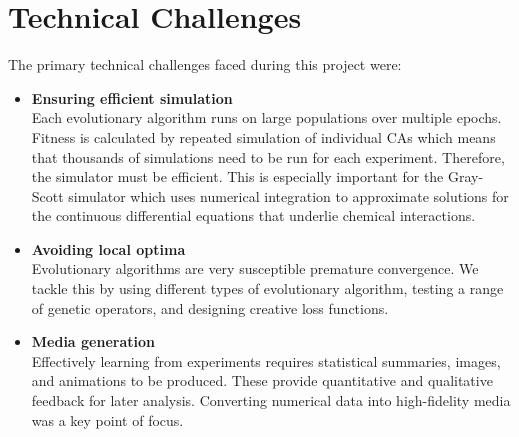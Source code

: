 \section{Technical Challenges}
The primary technical challenges faced during this project were:
\begin{itemize}
    \item \textbf{Ensuring efficient simulation}\\ Each evolutionary algorithm runs on large populations over multiple epochs. Fitness is calculated by repeated simulation of individual CAs which means that thousands of simulations need to be run for each experiment. Therefore, the simulator must be efficient. This is especially important for the Gray-Scott simulator which uses numerical integration to approximate solutions for the continuous differential equations that underlie chemical interactions.
    \item \textbf{Avoiding local optima}\\ Evolutionary algorithms are very susceptible premature convergence. We tackle this by using different types of evolutionary algorithm, testing a range of genetic operators, and designing creative loss functions.
    \item \textbf{Media generation}\\ Effectively learning from experiments requires statistical summaries, images, and animations to be produced. These provide quantitative and qualitative feedback for later analysis. Converting numerical data into high-fidelity media was a key point of focus.
\end{itemize}
